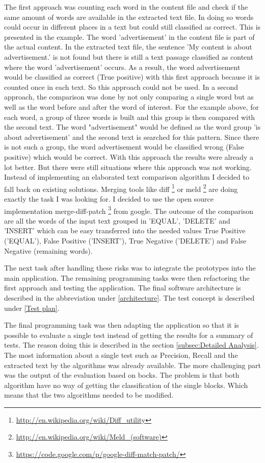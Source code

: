 The first approach was counting each word in the content file and check if the same amount of words are available in the extracted text file. In doing so words could occur in different places in a text but could still classified as correct. This is presented in the example. The word 'advertisement' in the content file is part of the actual content. In the extracted text file, the sentence 'My content is about advertisement.' is not found but there is still a text passage classified as content where the word 'advertisement' occurs. As a result, the word advertisement would be classified as correct (True positive) with this first approach because it is counted once in each text. So this approach could not be used.
In a second approach, the comparison was done by not only comparing a single word but as well as the word before and after the word of interest. 
For the example above, for each word, a group of three words is built and this group is then compared with the second text. The word "advertisement" would be defined as the word group 'is about advertisement' and the second text is searched for this pattern. Since there is not such a group, the word advertisement would be classified wrong (False positive) which would be correct. With this approach the results were already a lot better. But there were still situations where this approach was not working. Instead of implementing an elaborated text comparison algorithm I decided to fall back on existing solutions. Merging tools like diff \footnote{\url{http://en.wikipedia.org/wiki/Diff\_utility}} or meld \footnote{\url{http://en.wikipedia.org/wiki/Meld\_(software)}} are doing exactly the task I was looking for. I decided to use the open source implementation merge-diff-patch \footnote{\url{https://code.google.com/p/google-diff-match-patch/}} from google.  The outcome of the comparison are all the words of the input text grouped in 'EQUAL', 'DELETE' and 'INSERT' which can be easy transferred into the needed values True Positive ('EQUAL'), False Positive ('INSERT'), True Negative ('DELETE') and False Negative (remaining words). 


The next task after handling these risks was to integrate the prototypes into the main application. The remaining programming tasks were then refactoring the first approach and testing the application. The final software architecture is described in the abbreviation under \ref{architecture}. The test concept is described under \ref{Test plan}. 

The final programming task was then adapting the application so that it is possible to evaluate a single test instead of getting the results for a summary of tests. The reason doing this is described in the section \ref{subsec:Detailed Analysis}. 
The most information about a single test such as Precision, Recall and the extracted text by the algorithms was already available. The more challenging part was the output of the evaluation based on bocks. The problem is that both algorithm have no way of getting the classification of the single blocks. Which means that the two algorithms needed to be modified.

